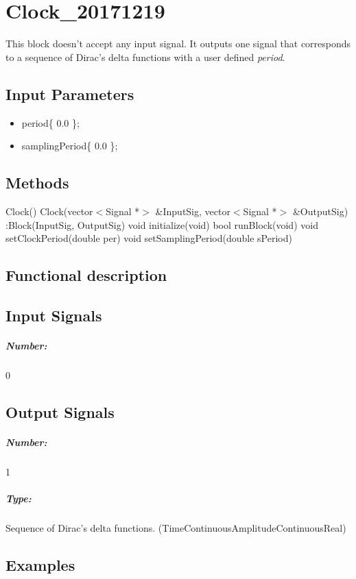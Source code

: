 \clearpage

\section{Clock_20171219}

This block doesn't accept any input signal. It outputs one signal that corresponds to a sequence of Dirac's delta functions with a user defined \textit{period}.

\subsection*{Input Parameters}

\begin{itemize}
	\item period\{ 0.0 \};
	\item samplingPeriod\{ 0.0 \};
\end{itemize}

\subsection*{Methods}

Clock() {}
\bigbreak
Clock(vector$<$Signal *$>$ \&InputSig, vector$<$Signal *$>$ \&OutputSig) :Block(InputSig, OutputSig) {}
\bigbreak
void initialize(void)
\bigbreak
bool runBlock(void)
\bigbreak
void setClockPeriod(double per)
\bigbreak
void setSamplingPeriod(double sPeriod)

\subsection*{Functional description}


\pagebreak

\subsection*{Input Signals}

\subparagraph*{Number:} 0

\subsection*{Output Signals}

\subparagraph*{Number:} 1

\subparagraph*{Type:} Sequence of Dirac's delta functions. (TimeContinuousAmplitudeContinuousReal)

\subsection*{Examples}

